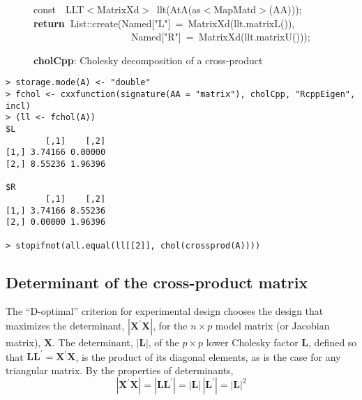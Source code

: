 \documentclass[shortnames,article]{jss}
\newcommand{\hlstd}[1]{\textcolor[rgb]{0,0,0}{#1}}
\newcommand{\hlopt}[1]{\textcolor[rgb]{0,0,0}{#1}}
\newcommand{\hlstr}[1]{\textcolor[rgb]{0.90,0.15,0.15}{#1}}
\newcommand{\hlkwa}[1]{\textcolor[rgb]{0.61,0.13,0.93}{\bf{#1}}}
\newcommand{\hlkwb}[1]{\textcolor[rgb]{0.13,0.54,0.13}{#1}}
\newcommand{\hlkwd}[1]{\textcolor[rgb]{0,0,0}{#1}}
\begin{document}
\begin{figure}[htb]
  \noindent
  \ttfamily
  \hlstd{}\hlkwb{const}\hlstd{\ \ }\hlkwb{}\hlstd{LLT}\hlopt{$<$}\hlstd{MatrixXd}\hlopt{$>$\ }\hlstd{}\hlkwd{llt}\hlstd{}\hlopt{(}\hlstd{}\hlkwd{AtA}\hlstd{}\hlopt{(}\hlstd{as}\hlopt{$<$}\hlstd{MapMatd}\hlopt{$>$(}\hlstd{AA}\hlopt{)));}\hspace*{\fill}\\
  \hlstd{}\hlkwa{return\ }\hlstd{List}\hlopt{::}\hlstd{}\hlkwd{create}\hlstd{}\hlopt{(}\hlstd{Named}\hlopt{{[}}\hlstd{}\hlstr{"L"}\hlstd{}\hlopt{{]}\ =\ }\hlstd{}\hlkwd{MatrixXd}\hlstd{}\hlopt{(}\hlstd{llt}\hlopt{.}\hlstd{}\hlkwd{matrixL}\hlstd{}\hlopt{()),}\hspace*{\fill}\\
  \hlstd{}\hlstd{\ \ \ \ \ \ \ \ \ \ \ \ \ \ \ \ \ \ \ \ }\hlstd{Named}\hlopt{{[}}\hlstd{}\hlstr{"R"}\hlstd{}\hlopt{{]}\ =\ }\hlstd{}\hlkwd{MatrixXd}\hlstd{}\hlopt{(}\hlstd{llt}\hlopt{.}\hlstd{}\hlkwd{matrixU}\hlstd{}\hlopt{()));}\hlstd{}\hspace*{\fill}\\
  \mbox{}
  \normalfont
  \normalsize
  \caption{\textbf{cholCpp}: Cholesky decomposition of a cross-product}
  \label{chol}
\end{figure}

\begin{verbatim}
> storage.mode(A) <- "double"
> fchol <- cxxfunction(signature(AA = "matrix"), cholCpp, "RcppEigen", incl)
> (ll <- fchol(A))
$L
        [,1]    [,2]
[1,] 3.74166 0.00000
[2,] 8.55236 1.96396

$R
        [,1]    [,2]
[1,] 3.74166 8.55236
[2,] 0.00000 1.96396

> stopifnot(all.equal(ll[[2]], chol(crossprod(A))))
\end{verbatim}



\subsection{Determinant of the cross-product matrix}
\label{sec:determinant}

The ``D-optimal'' criterion for experimental design chooses the design
that maximizes the determinant, $|\bm X^\prime\bm X|$, for the
$n\times p$ model matrix (or Jacobian matrix), $\bm X$.  The
determinant, $|\bm L|$, of the $p\times p$ lower Cholesky factor
$\bm L$, defined so that $\bm L\bm L^\prime=\bm X^\prime\bm X$, is
the product of its diagonal elements, as is the case for any
triangular matrix.  By the properties of determinants,
\begin{displaymath}
  |\bm X^\prime\bm X|=|\bm L\bm L^\prime|=|\bm L|\,|\bm L^\prime|=|\bm L|^2
\end{displaymath}
\end{document}
